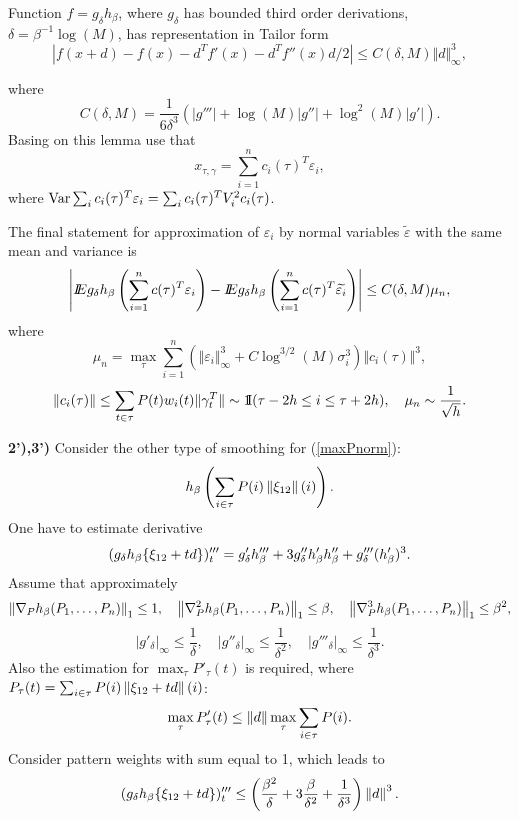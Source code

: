 \begin{lemma}
Function $f = g_{\delta} h_{\beta}$, where $g_{\delta}$ has bounded third order derivations, $\delta = \beta^{-1} \log(M)$, has representation in Tailor form
\[
\left| f(x + d) - f(x) - d^{T}f'(x) - d^{T}f''(x)d /2 \right |  
\leq C(\delta, M) \Vert d \Vert_{\infty}^{3},
\]
\end{lemma} 
where
\[
C(\delta, M) =  \frac{1}{6 \delta^3 } (|g'''| + \log(M) |g''| + \log^2(M) |g'|).
\]
Basing on this lemma  use that
\[
x_{\tau,\gamma} = \sum_{i=1}^{n} c_i(\tau)^{T} \varepsilon_i,
\]
where $\operatorname{Var} \sum_{i} c_i(\tau)^{T} \varepsilon_i = \sum_{i} c_i(\tau)^{T} V_i^2 c_i(\tau)$. 

The final statement for approximation of $\varepsilon_i$ by normal variables $\widetilde{\varepsilon}$ with the same mean and variance is
\begin{equation}
\left \vert I\!\!E g_{\delta} h_\beta  \left(\sum_{i = 1}^{n} c(\tau)^T \varepsilon_i \right)  -  I\!\!E g_{\delta} h_\beta \left(\sum_{i = 1}^{n} c(\tau)^T \widetilde{\varepsilon_i} \right) \right \vert \leq C(\delta, M) \mu_n,
\end{equation}  
where
\[
\mu_n = \max_{\tau} \sum_{i=1}^{n} ( \Vert \varepsilon_i \Vert_{\infty}^3 + C \log^{3/2} (M) \sigma_i^3  ) \Vert c_i(\tau) \Vert^3,
\]
\[
\Vert c_i(\tau) \Vert \leq \sum_{t \in \tau} P(t) w_i(t) \Vert \gamma_t^{T} \Vert \sim \operatorname{1}\hspace{-4.3pt}\operatorname{I} (\tau - 2h \leq  i \leq \tau + 2h),
\quad
\mu_n \sim \frac{1}{\sqrt{h}}.
\]

\noindent\textbf{2'),3')}
Consider the other type of smoothing for (\ref{maxPnorm}):
\[
h_{\beta} \left(
\sum_{i \in \tau} P(i) \left\Vert \xi_{12} \right\Vert(i)
\right).
\] 
One have to estimate derivative 
\[
(g_\delta h_\beta \{\xi_{12} + t d \} )'''_t = g'_\delta h'''_\beta  + 3 g''_\delta h'_\beta h''_\beta + g'''_\delta (h'_\beta)^{3}.
\]
Assume that approximately
\[
 \left\Vert \nabla_P h_\beta (P_1, \ldots, P_n)  \right\Vert_1 \leq 1, 
 \quad  
 \left\Vert \nabla^2_P h_\beta (P_1, \ldots, P_n)  \right\Vert_1 \leq \beta, 
 \quad
 \left\Vert \nabla^3_P h_\beta (P_1, \ldots, P_n)  \right\Vert_1 \leq \beta^2,  
\]
\[
|g'_\delta|_{\infty} \leq \frac{1}{\delta},
\quad
|g''_\delta|_{\infty} \leq \frac{1}{\delta^2}, 
\quad
|g'''_\delta|_{\infty} \leq \frac{1}{\delta^3}. 
\]
Also the estimation for $\max_{\tau}  P'_\tau(t) $ is required, where $P_\tau(t) = \sum_{i \in \tau} P(i) \left\Vert \xi_{12} + td \right\Vert(i)$:
\[
\max_{\tau}  P'_\tau(t)  \leq  \left\Vert d \right\Vert \max_{\tau} \sum_{i \in \tau} P(i). 
\]
Consider pattern weights with sum equal to 1, which leads to
\[
(g_\delta h_\beta \{\xi_{12} + t d \} )'''_t \leq 
\left(
 \frac{\beta^2}{\delta} + 3 \frac{\beta}{\delta^2} +  \frac{1}{\delta^3}
\right)
 \left\Vert d \right\Vert^3.  
\]

